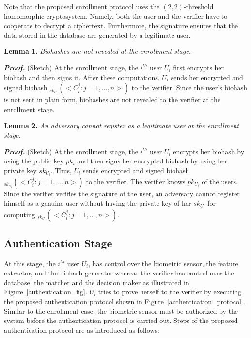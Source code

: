 \documentclass[journal]{IEEEtran}
\begin{document}
Note that the proposed enrollment protocol uses the $(2,2)$-threshold homomorphic cryptosystem. Namely, both the user and the verifier have to cooperate to decrypt a ciphertext. Furthermore, the signature ensures that the data stored in the database are generated by a legitimate user.  

\textbf{Lemma 1.} \textit{Biohashes are not revealed at the enrollment stage.}

\textbf{\textit{Proof.}} (Sketch) At the enrollment stage, the $i^{th}$ user $U_i$ first encrypts her biohash and then signs it. After these computations, $U_i$ sends her encrypted and signed biohash $_{sk_{U_i}}(<C^{j}_{i}:j=1,\ldots,n>)$ to the verifier. Since the user's biohash is not sent in plain form, biohashes are not revealed to the verifier at the enrollment stage.

\textbf{Lemma 2.} \textit{An adversary cannot register as a legitimate user at the enrollment stage.}

\textbf{\textit{Proof.}} (Sketch) At the enrollment stage, the $i^{th}$ user $U_i$ encrypts her biohash by using the public key $pk_i$ and then signs her encrypted biohash by using her private key $sk_{U_i}$. Thus, $U_i$ sends encrypted and signed biohash $_{sk_{U_i}}(<C^{j}_{i}:j=1,\ldots,n>)$ to the verifier. The verifier knows $pk_{U_i}$ of the users. Since the verifier verifies the signature of the user, an adversary cannot register himself as a genuine user without having the private key of her $sk_{U_i}$ for computing $_{sk_{U_i}}(<C^{j}_{i}:j=1,\ldots,n>)$.





\subsection{Authentication Stage}

At this stage, the $i^{th}$ user $U_i$, has control over the biometric sensor, the feature extractor, and the biohash generator whereas the verifier has control over the database, the matcher and the decision maker as illustrated in Figure~\ref{authentication_fig}. $U_i$ tries to prove herself to the verifier by executing the proposed authentication protocol shown in Figure~\ref{authentication_protocol}. Similar to the enrollment case, the biometric sensor must be authorized by the system before the authentication protocol is carried out. Steps of the proposed authentication protocol are as introduced as follows:
\end{document}
